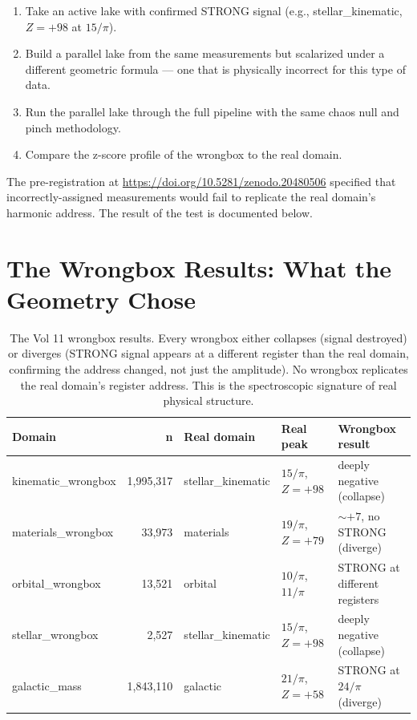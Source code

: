 \documentclass[11pt, letterpaper, openany]{book}
\begin{document}
\begin{enumerate}
\item Take an active lake with confirmed STRONG signal (e.g., stellar\_kinematic,
  $Z = +98$ at $15/\pi$).
\item Build a parallel lake from the same measurements but scalarized under a
  different geometric formula --- one that is physically incorrect for this type
  of data.
\item Run the parallel lake through the full pipeline with the same chaos null
  and pinch methodology.
\item Compare the z-score profile of the wrongbox to the real domain.
\end{enumerate}

The pre-registration at \url{https://doi.org/10.5281/zenodo.20480506} specified
that incorrectly-assigned measurements would fail to replicate the real domain's
harmonic address. The result of the test is documented below.

\section{The Wrongbox Results: What the Geometry Chose}

\begin{table}[H]
\centering
\renewcommand{\arraystretch}{1.4}
\small
\begin{tabular}{|l|r|l|l|l|}
\hline
\rowcolor{kishblue!10}
\textbf{Domain} & \textbf{n} & \textbf{Real domain} & \textbf{Real peak} & \textbf{Wrongbox result} \\
\hline\hline
\rowcolor{dimensionred!5}
kinematic\_wrongbox & 1,995,317 & stellar\_kinematic & $15/\pi$, $Z=+98$ & deeply negative (collapse) \\
\rowcolor{dimensionred!4}
materials\_wrongbox & 33,973    & materials          & $19/\pi$, $Z=+79$ & $\sim{+7}$, no STRONG (diverge) \\
\rowcolor{dimensionred!4}
orbital\_wrongbox   & 13,521    & orbital            & $10/\pi$, $11/\pi$ & STRONG at different registers \\
\rowcolor{dimensionred!4}
stellar\_wrongbox   & 2,527     & stellar\_kinematic & $15/\pi$, $Z=+98$ & deeply negative (collapse) \\
\rowcolor{subnucleargold!5}
galactic\_mass      & 1,843,110 & galactic           & $21/\pi$, $Z=+58$ & STRONG at $24/\pi$ (diverge) \\
\hline
\end{tabular}
\caption{The Vol 11 wrongbox results. Every wrongbox either collapses
(signal destroyed) or diverges (STRONG signal appears at a different register
than the real domain, confirming the address changed, not just the amplitude).
No wrongbox replicates the real domain's register address. This is the
spectroscopic signature of real physical structure.}
\label{tab:v11_wrongboxes}
\end{table}
\end{document}
